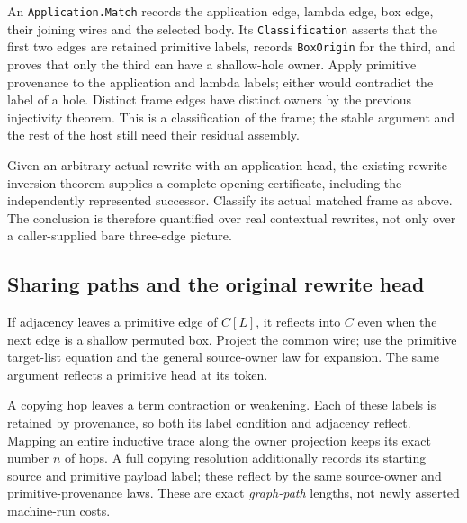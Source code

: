 
An \texttt{Application.Match} records the application edge, lambda edge,
box edge, their joining wires and the selected body. Its
\texttt{Classification} asserts that the first two edges are retained
primitive labels, records \texttt{BoxOrigin} for the third, and proves that
only the third can have a shallow-hole owner. Apply primitive provenance
to the application and lambda labels; either would contradict the label
of a hole. Distinct frame edges have distinct owners by the previous
injectivity theorem. This is a classification of the frame; the stable
argument and the rest of the host still need their residual assembly.


Given an arbitrary actual rewrite with an application head, the existing
rewrite inversion theorem supplies a complete opening certificate, including
the independently represented successor. Classify its actual matched frame
as above. The conclusion is therefore quantified over real contextual
rewrites, not only over a caller-supplied bare three-edge picture.


\subsection{Sharing paths and the original rewrite head}
If adjacency leaves a primitive edge of $C[L]$, it reflects into $C$ even
when the next edge is a shallow permuted box. Project the common wire;
use the primitive target-list equation and the general source-owner law
for expansion. The same argument reflects a primitive head at its token.


A copying hop leaves a term contraction or weakening. Each of these labels
is retained by provenance, so both its label condition and adjacency
reflect. Mapping an entire inductive trace along the owner projection keeps
its exact number $n$ of hops. A full copying resolution additionally records
its starting source and primitive payload label; these reflect by the same
source-owner and primitive-provenance laws. These are exact \emph{graph-path}
lengths, not newly asserted machine-run costs.

